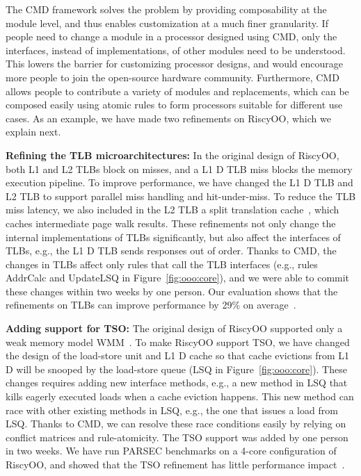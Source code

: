 \documentclass[conference]{IEEEtran}
\begin{document}
The CMD framework solves the problem by providing composability at the module level, and thus enables customization at a much finer granularity.
If people need to change a module in a processor designed using CMD, only the interfaces, instead of implementations, of other modules need to be understood.
This lowers the barrier for customizing processor designs, and would encourage more people to join the open-source hardware community.
Furthermore, CMD allows people to contribute a variety of modules and replacements, which can be composed easily using atomic rules to form processors suitable for different use cases.
As an example, we have made two refinements on RiscyOO, which we explain next.

\noindent\textbf{Refining the TLB microarchitectures:}
In the original design of RiscyOO, both L1 and L2 TLBs block on misses, and a L1 D TLB miss blocks the memory execution pipeline.
To improve performance, we have changed the L1 D TLB and L2 TLB to support parallel miss handling and hit-under-miss.
To reduce the TLB miss latency, we also included in the L2 TLB a split translation cache~\cite{translationCache}, which caches intermediate page walk results.
These refinements not only change the internal implementations of TLBs significantly, but also affect the interfaces of TLBs, e.g., the L1 D TLB sends responses out of order.
Thanks to CMD, the changes in TLBs affect only rules that call the TLB interfaces (e.g., rules AddrCalc and UpdateLSQ in Figure~\ref{fig:ooo:core}), and we were able to commit these changes within two weeks by one person.
Our evaluation shows that the refinements on TLBs can improve performance by 29\% on average~\cite{riscyoo}.

\noindent\textbf{Adding support for TSO:}
The original design of RiscyOO supported only a weak memory model WMM~\cite{wmm}.
To make RiscyOO support TSO, we have changed the design of the load-store unit and L1 D cache so that cache evictions from L1 D will be snooped by the load-store queue (LSQ in Figure~\ref{fig:ooo:core}).
These changes requires adding new interface methods, e.g., a new method in LSQ that kills eagerly executed loads when a cache eviction happens.
This new method can race with other existing methods in LSQ, e.g., the one that issues a load from LSQ.
Thanks to CMD, we can resolve these race conditions easily by relying on conflict matrices and rule-atomicity.
The TSO support was added by one person in two weeks.
We have run PARSEC benchmarks on a 4-core configuration of RiscyOO, and showed that the TSO refinement has little performance impact~\cite{riscyoo}.
\end{document}
